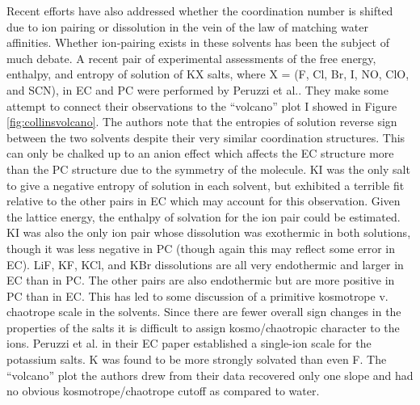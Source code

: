 \begin{intro}
   Recent efforts have also addressed whether the coordination number is shifted due to ion pairing or dissolution in the vein of the law of matching water affinities. 
   Whether ion-pairing exists in these solvents has been the subject of much debate\cite{smith2014x}. A recent pair of experimental assessments of the free energy, enthalpy, 
   and entropy of solution of KX salts, where X = (F\sur{-}, Cl\sur{-}, Br\sur{-}, I\sur{-}, NO, ClO, and SCN\sur{-}), in EC and PC were performed 
   by Peruzzi et al.\cite{peruzzi2012hofmeister,peruzzi2015solvation}. They make some attempt to connect their observations to the ``volcano'' plot I showed in Figure
   \ref{fig:collinsvolcano}. The authors note that the entropies of solution reverse sign between the two solvents despite their very similar coordination structures. This
   can only be chalked up to an anion effect which affects the EC structure more than the PC structure due to the symmetry of the molecule\cite{jones2009thermodynamic}. 
   KI was the only salt to give a negative entropy of solution in each solvent, but exhibited a terrible fit relative to the other pairs in EC which may account for this
   observation\cite{peruzzi2012hofmeister,peruzzi2015solvation}. Given the lattice energy, the enthalpy of solvation for the ion pair could be estimated. KI was also the
   only ion pair whose dissolution was exothermic in both solutions, though it was less negative in PC (though again this may reflect some error in EC). LiF, KF, KCl, and 
   KBr dissolutions are all very endothermic and larger in EC than in PC\cite{jones2009thermodynamic,peruzzi2012hofmeister,peruzzi2015solvation}. The other pairs are also
   endothermic but are more positive in PC than in EC. This has led to some discussion of a primitive kosmotrope v. chaotrope scale in the solvents\cite{peruzzi2012hofmeister,peruzzi2015solvation}.
   Since there are fewer overall sign changes in the properties of the salts it is difficult to assign kosmo/chaotropic character to the ions. Peruzzi et al. in their EC 
   paper established a single-ion scale for the potassium salts. K\sur{+} was found to be more strongly solvated than even F\sur{-}. The ``volcano'' plot the authors 
   drew from their data recovered only one slope and had no obvious kosmotrope/chaotrope cutoff as compared to water. 
   

\end{intro}
